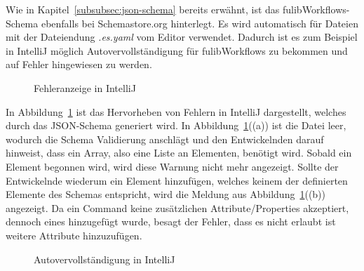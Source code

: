 Wie in Kapitel~\ref{subsubsec:json-schema} bereits erwähnt, ist das fulibWorkflows-Schema ebenfalls bei Schemastore.org hinterlegt.
Es wird automatisch für Dateien mit der Dateiendung \textit{.es.yaml} vom Editor verwendet.
Dadurch ist es zum Beispiel in IntelliJ möglich Autovervollständigung für fulibWorkflows zu bekommen und auf Fehler hingewiesen zu werden.

\begin{figure}%
    \centering
    \qquad
    \caption{Fehleranzeige in IntelliJ}%
    \label{fig:errors-schema}%
\end{figure}

In Abbildung~\ref{fig:errors-schema} ist das Hervorheben von Fehlern in IntelliJ dargestellt, welches durch das JSON-Schema generiert wird.
In Abbildung~\ref{fig:errors-schema}((a)) ist die Datei leer, wodurch die Schema Validierung anschlägt und den Entwickelnden darauf hinweist, dass ein Array, also eine Liste an Elementen, benötigt wird.
Sobald ein Element begonnen wird, wird diese Warnung nicht mehr angezeigt.
Sollte der Entwickelnde wiederum ein Element hinzufügen, welches keinem der definierten Elemente des Schemas entspricht, wird die Meldung aus Abbildung~\ref{fig:errors-schema}((b)) angezeigt.
Da ein Command keine zusätzlichen Attribute/Properties akzeptiert, dennoch eines hinzugefügt wurde, besagt der Fehler, dass es nicht erlaubt ist weitere Attribute hinzuzufügen.

\begin{figure}%
    \centering
    \qquad
    \caption{Autovervollständigung in IntelliJ}%
    \label{fig:completion-schema}%
\end{figure}

